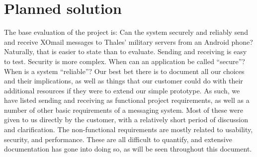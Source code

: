 \section{Planned solution}

The base evaluation of the project is: Can the system securely and reliably send and receive XOmail messages to Thales’ military servers from an Android phone? Naturally, that is easier to state than to evaluate. 
\newline
\newline
Sending and receiving is easy to test. Security is more complex. When can an application be called “secure”? When is a system “reliable”? Our best bet there is to document all our choices and their implications, as well as things that our customer could do with their additional resources if they were to extend our simple prototype. 
\newline
\newline
As such, we have listed sending and receiving as functional project requirements, as well as a number of other basic requirements of a messaging system. Most of these were given to us directly by the customer, with a relatively short period of discussion and clarification. 
\newline
\newline
The non-functional requirements are mostly related to usability, security, and performance. These are all difficult to quantify, and extensive documentation has gone into doing so, as will be seen throughout this document. 